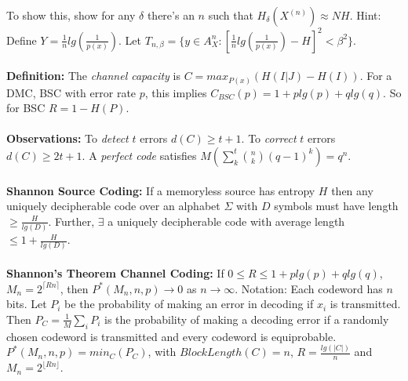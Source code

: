 To show this, show for any $\delta$ there's an $n$ such that $H_{\delta}
(X^{(n)}) \approx NH$.
Hint: Define $Y = {\frac {1} {n}} lg({\frac {1} {p(x)}})$.  Let
$T_{n, \beta}= \{ y \in A^{n}_X :
{[{\frac {1} {n}} lg({\frac {1} {p(x)}}) -H]}^2 < \beta^2 \}$.
\\
\\
{\bf Definition:}
The \emph{channel capacity} is $C= max_{P(x)} (H(I|J)-H(I))$.  For a DMC, BSC with error
rate $p$, this implies $C_{BSC}(p)= 1+p lg(p) + q lg(q)$.  So for BSC
$R=1-H(P)$.
\\
\\
{\bf Observations:}
To \emph{detect} $t$ errors $d(C) \geq t+1$.
To \emph{correct} $t$ errors $d(C) \geq 2t+1$.
A \emph{perfect code} satisfies $M (\sum_k^t {n \choose k} (q-1)^k)= q^n$.
\\
\\
{\bf Shannon Source Coding:}  If a memoryless source has entropy $H$ then any
uniquely decipherable
code over an alphabet $\Sigma$ with $D$ symbols must have length $\geq
{\frac H {lg(D)}}$.  Further,
$\exists$ a uniquely decipherable code with average length $\leq 1+ {\frac H
{lg(D)}}$.
\\
\\
{\bf Shannon's Theorem Channel Coding:}
If $0 \leq R \leq 1+ p lg(p)+ q lg(q)$, $M_n = 2^{\lceil Rn \rceil}$,
then $P^{*} (M_n , n, p) \rightarrow 0$ as $n \rightarrow \infty$.
Notation: Each codeword has $n$ bits.
Let $P_i$ be the probability of making an error in
decoding if $x_i$ is transmitted. Then
$P_C = {\frac 1 M} \sum_i P_i$ is the probability of making a decoding error
if a randomly chosen codeword is transmitted and
every codeword is equiprobable.
$P^{*} (M_n , n, p) = min_{C} (P_C )$, with
$BlockLength(C)=n$,  $R= {\frac {lg(|C|)} {n}}$
and $M_n= 2^{\lfloor Rn \rfloor}$.
